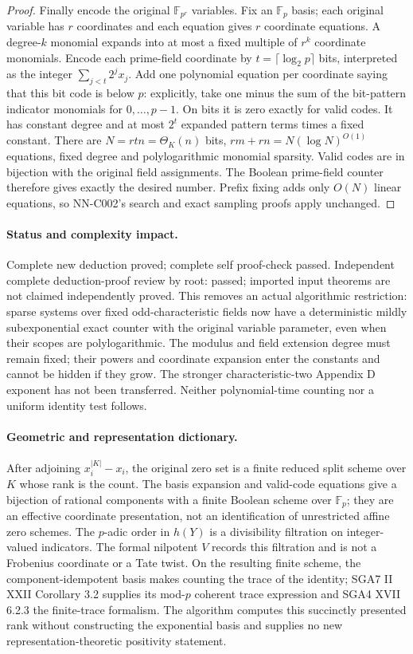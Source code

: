 \begin{proof}
Finally encode the original $\mathbb F_{p^r}$ variables. Fix an $\mathbb F_p$ basis; each original variable has $r$ coordinates and each equation gives $r$ coordinate equations. A degree-$k$ monomial expands into at most a fixed multiple of $r^k$ coordinate monomials. Encode each prime-field coordinate by $t=\lceil\log_2p\rceil$ bits, interpreted as the integer $\sum_{j<t}2^jx_j$. Add one polynomial equation per coordinate saying that this bit code is below $p$: explicitly, take one minus the sum of the bit-pattern indicator monomials for $0,\ldots,p-1$. On bits it is zero exactly for valid codes. It has constant degree and at most $2^t$ expanded pattern terms times a fixed constant. There are $N=rtn=\Theta_K(n)$ bits, $rm+rn=N(\log N)^{O(1)}$ equations, fixed degree and polylogarithmic monomial sparsity. Valid codes are in bijection with the original field assignments. The Boolean prime-field counter therefore gives exactly the desired number. Prefix fixing adds only $O(N)$ linear equations, so NN-C002's search and exact sampling proofs apply unchanged.
\end{proof}
\paragraph{Status and complexity impact.}
Complete new deduction proved; complete self proof-check passed. Independent complete deduction-proof review by root: passed; imported input theorems are not claimed independently proved. This removes an actual algorithmic restriction: sparse systems over fixed odd-characteristic fields now have a deterministic mildly subexponential exact counter with the original variable parameter, even when their scopes are polylogarithmic. The modulus and field extension degree must remain fixed; their powers and coordinate expansion enter the constants and cannot be hidden if they grow. The stronger characteristic-two Appendix D exponent has not been transferred. Neither polynomial-time counting nor a uniform identity test follows.

\paragraph{Geometric and representation dictionary.}
After adjoining $x_i^{|K|}-x_i$, the original zero set is a finite reduced split scheme over $K$ whose rank is the count. The basis expansion and valid-code equations give a bijection of rational components with a finite Boolean scheme over $\mathbb F_p$; they are an effective coordinate presentation, not an identification of unrestricted affine zero schemes. The $p$-adic order in $h(Y)$ is a divisibility filtration on integer-valued indicators. The formal nilpotent $V$ records this filtration and is not a Frobenius coordinate or a Tate twist. On the resulting finite scheme, the component-idempotent basis makes counting the trace of the identity; SGA7 II XXII Corollary 3.2 supplies its mod-$p$ coherent trace expression and SGA4 XVII 6.2.3 the finite-trace formalism. The algorithm computes this succinctly presented rank without constructing the exponential basis and supplies no new representation-theoretic positivity statement.



